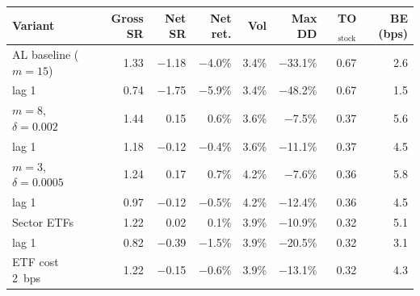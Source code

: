 \setlength{\tabcolsep}{4pt}
\begin{tabular}{@{}lrrrrrrr@{}}
\toprule
Variant & Gross SR & Net SR & Net ret. & Vol & Max DD & TO$_{\text{stock}}$ & BE (bps)\\
\midrule
AL baseline ($m=15$) & 1.33 & \ensuremath{-}1.18 & \ensuremath{-}4.0\% & 3.4\% & \ensuremath{-}33.1\% & 0.67 & 2.6\\
\quad lag 1 & 0.74 & \ensuremath{-}1.75 & \ensuremath{-}5.9\% & 3.4\% & \ensuremath{-}48.2\% & 0.67 & 1.5\\
\midrule
$m=8$, $\delta=0.002$ & 1.44 & 0.15 & 0.6\% & 3.6\% & \ensuremath{-}7.5\% & 0.37 & 5.6\\
\quad lag 1 & 1.18 & \ensuremath{-}0.12 & \ensuremath{-}0.4\% & 3.6\% & \ensuremath{-}11.1\% & 0.37 & 4.5\\
\midrule
$m=3$, $\delta=0.0005$ & 1.24 & 0.17 & 0.7\% & 4.2\% & \ensuremath{-}7.6\% & 0.36 & 5.8\\
\quad lag 1 & 0.97 & \ensuremath{-}0.12 & \ensuremath{-}0.5\% & 4.2\% & \ensuremath{-}12.4\% & 0.36 & 4.5\\
\midrule
Sector ETFs & 1.22 & 0.02 & 0.1\% & 3.9\% & \ensuremath{-}10.9\% & 0.32 & 5.1\\
\quad lag 1 & 0.82 & \ensuremath{-}0.39 & \ensuremath{-}1.5\% & 3.9\% & \ensuremath{-}20.5\% & 0.32 & 3.1\\
\quad ETF cost 2~bps & 1.22 & \ensuremath{-}0.15 & \ensuremath{-}0.6\% & 3.9\% & \ensuremath{-}13.1\% & 0.32 & 4.3\\
\bottomrule
\end{tabular}
